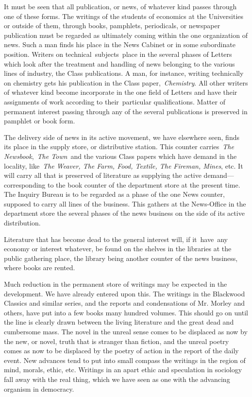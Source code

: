 \documentclass[openany,nobib]{tufte-book}
\begin{document}
It must be seen that all publication, or news, of whatever kind passes
through one of these forms. The writings of the students of economics at
the Universities or outside of them, through books, pamphlets,
periodicals, or newspaper publication must be regarded as ultimately
coming within the one organization of news. Such a man finds his place
in the News Cabinet or in some subordinate position. Writers on
technical~subjects~place in the several phases of Letters which look
after the treatment and handling of news belonging to the various lines
of industry, the Class publications. A man, for instance, writing
technically on chemistry gets his publication in the Class
paper,~\emph{Chemistry}. All other writers of whatever kind become
incorporate in the one field of Letters and have their assignments of
work according to their~particular qualifications. Matter of permanent
interest passing through any of the several publications is preserved in
pamphlet or book form.~

The delivery side of news in its active movement, we have elsewhere
seen, finds its place in the supply store, or distributive station. This
counter carries~\emph{The Newsbook},~\emph{The Town}~and the various
Class papers which have demand in the locality, like~\emph{The Weaver,
The Farm, Food, Textile, The Fireman, Mines}, etc. It will carry all
that is preserved of literature as supplying the active
demand---corresponding to the book counter of the department store at
the present time. The Inquiry Bureau is to be regarded as a phase of the
one News counter, supposed to carry all lines of the business. This
gathers at the News-Office in the department store the several phases of
the news business on the side of its active distribution.~

Literature that has become dead to the general interest will, if
it~have~any economy or interest whatever, be found on the shelves in the
libraries at the public gathering place, the library being another
counter of the news business, where books are rented.~

Much reduction in the permanent store of writings may be expected in the
development. We have already entered upon this. The writings in the
Blackwood Classics and similar series, and the reports and condensations
of Mr. Morley and others, have put into a few books many hundred
volumes. This should go on until the line is clearly drawn between the
living literature and the great dead and cumbersome mass. The novel in
the unreal sense comes to be displaced as now by the new, or novel,
truth that is stranger than fiction, and the unreal poetry comes as now
to be displaced by the poetry of action in the report of the daily
event. New advances tend to put into small compass the writings in the
region of mind, morals, ethic, etc. Writings in an apart ethic and
speculation in sociology fall away with the real thing, which we have
seen as one with the advancing organism in democracy.~
\end{document}
